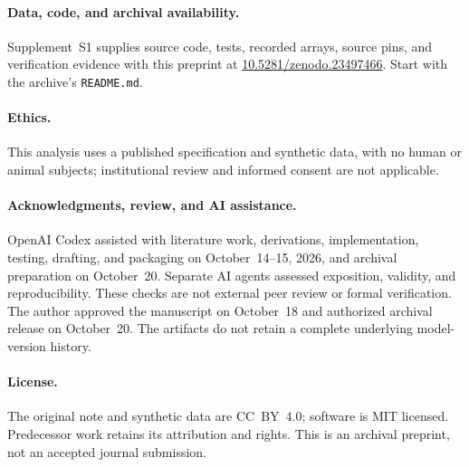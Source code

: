 \paragraph{Data, code, and archival availability.}
Supplement~S1 supplies source code, tests, recorded arrays, source pins, and
verification evidence with this preprint at
\href{https://doi.org/10.5281/zenodo.23497466}{10.5281/zenodo.23497466}.
Start with the archive's \texttt{README.md}.

\paragraph{Ethics.}
This analysis uses a published specification and synthetic data, with no human
or animal subjects; institutional review and informed consent are not applicable.

\paragraph{Acknowledgments, review, and AI assistance.}
OpenAI Codex assisted with literature work, derivations, implementation, testing,
drafting, and packaging on October~14--15, 2026, and archival preparation on
October~20. Separate AI agents assessed exposition, validity, and reproducibility.
These checks are not external peer review or formal verification. The author
approved the manuscript on October~18 and authorized archival release on
October~20. The artifacts do not retain a complete underlying model-version history.

\paragraph{License.}
The original note and synthetic data are CC~BY~4.0; software is MIT licensed.
Predecessor work retains its attribution and rights. This is an archival preprint,
not an accepted journal submission.
